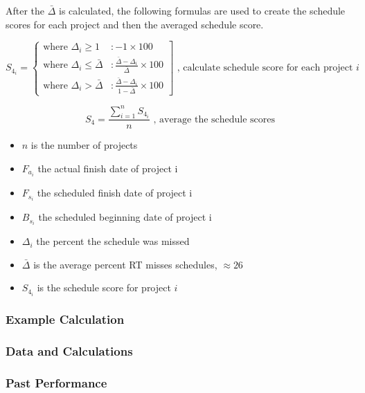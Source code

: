 \documentclass[SDSUThesis.tex]{subfiles}
\begin{document}
        After the $\bar{\Delta}$ is calculated, the following formulas are used to create the schedule scores
        for each project and then the averaged schedule score.
    
        \begin{displaymath}
           S_{4_i} = \left\{
             \begin{array}{lr}
                \text{where } \Delta_i \geq 1 & : -1 \times 100 \\
               \text{where }  \Delta_i \leq \bar{\Delta} & : \frac{\bar{\Delta} - \Delta_i}{\bar{\Delta}}   \times 100  \\
               \text{where } \Delta_i > \bar{\Delta} & : \frac{\bar{\Delta} - \Delta_i}{1 - \bar{\Delta}} \times 100
             \end{array}
           \right] \text{   , calculate schedule score for each project $i$}
        \end{displaymath} 

        \[
            S_{4} = \frac{\sum^n_{i=1} S_{4_i}}{n} \text{   , average the schedule scores}
        \]
        \begin{itemize}
            \item $n$ is the number of projects
            \item $F_{a_i}$ the actual finish date of project i
            \item $F_{s_i}$ the scheduled finish date of project i
            \item $B_{s_i}$ the scheduled beginning date of project i
            \item $\Delta_i$ the percent the schedule was missed
            \item $\bar{\Delta}$ is the average percent RT misses schedules, $\approx 26$
            \item $S_{4_i}$ is the schedule score for project $i$
        \end{itemize}
    
    
        
    \subsubsection{Example Calculation}
    \subsubsection{Data and Calculations}
    \subsubsection{Past Performance}
\end{document}
